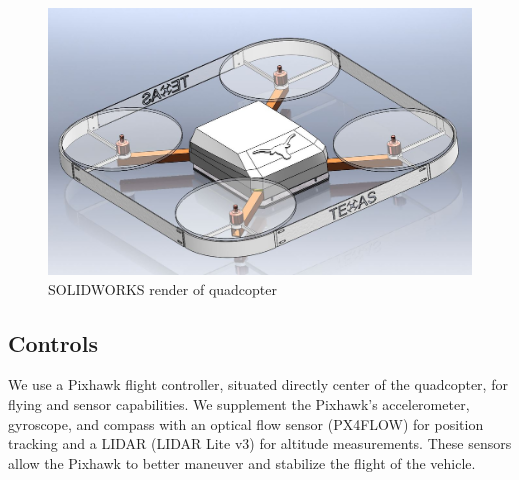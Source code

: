 \documentclass[12pt]{article}
\begin{document}
\begin{figure}[!htbp]
\begin{center}
\includegraphics[width=1\textwidth]{render}
\caption*{SOLIDWORKS render of quadcopter}
\end{center}
\end{figure}
\subsection{Controls}
We use a Pixhawk flight controller, situated directly center of the quadcopter, for flying and sensor capabilities. We supplement the Pixhawk's accelerometer, gyroscope, and compass with an optical flow sensor (PX4FLOW) for position tracking and a LIDAR (LIDAR Lite v3) for altitude measurements. These sensors allow the Pixhawk to better maneuver and stabilize the flight of the vehicle. 
\end{document}
